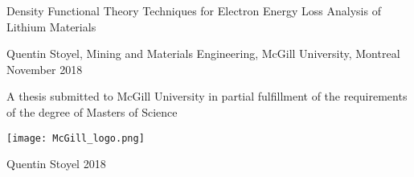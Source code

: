 \begin{titlepage}
    \begin{center}
        \vspace*{1cm}
        \huge
        {Density Functional Theory Techniques for Electron Energy Loss Analysis of Lithium Materials}
        
       
        
        
        
        \vspace{1.5cm}
        
        \large
        {Quentin Stoyel, Mining and Materials Engineering, McGill University, Montreal}\\
        
        {November 2018}
        
        
       \normalsize
       A thesis submitted to McGill University in partial fulfillment of the requirements of the degree of Masters of Science
        
		\vfill
        
		\texttt{[image: McGill\_logo.png]}
        
        {\textcopyright Quentin Stoyel 2018}
    \end{center}

\end{titlepage}

